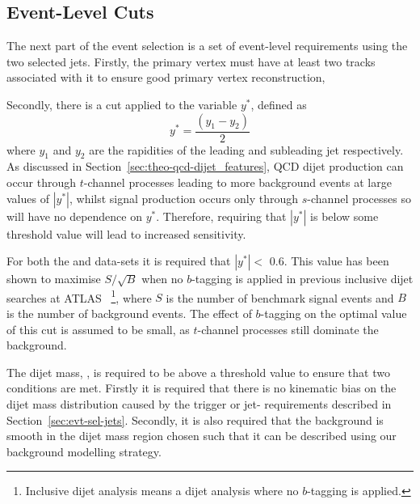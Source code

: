 \subsection{Event-Level Cuts}
\label{sec:evt-sel-event}

The next part of the event selection is a set of event-level requirements using the two selected jets.
Firstly, the primary vertex must have at least two  tracks associated with it
to ensure good primary vertex reconstruction,

\noindent
Secondly, there is a cut applied to the variable $y^*$, defined as
\begin{equation}
  y^* = \frac{(y_1-y_2)}{2}
\end{equation}
where $y_1$ and $y_2$ are the rapidities of the leading and subleading jet respectively.
As discussed in Section~\ref{sec:theo-qcd-dijet_features}, QCD dijet production can occur through $t$-channel processes leading to more background events at large values of $|y^*|$,
whilst signal production occurs only through $s$-channel processes so will have no dependence on $y^*$.
Therefore, requiring that $|y^*|$ is below some threshold value will lead to increased sensitivity.

For both the \summer{} and \lm{} data-sets it is required that $|y^*| <$ 0.6.
This value has been shown to maximise $S/\sqrt{B}$ when no $b$-tagging is applied
in previous inclusive dijet searches at ATLAS~\cite{dijet-mori16_paper}
\footnote{Inclusive dijet analysis means a dijet analysis where no $b$-tagging is applied.},
where $S$ is the number of benchmark signal events and $B$ is the number of background events.
The effect of $b$-tagging on the optimal value of this cut is assumed to be small,
as $t$-channel processes still dominate the background.



The dijet mass, \mjj{}, is required to be above a threshold value to ensure that two conditions are met.
Firstly it is required that there is no kinematic bias on the dijet mass distribution
caused by the trigger or jet-\pT{} requirements described in Section~\ref{sec:evt-sel-jets}.
Secondly, it is also required that the background is smooth in the dijet mass region chosen
such that it can be described using our background modelling strategy.

